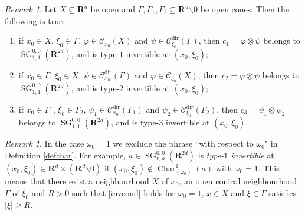 \documentclass[12pt,a4paper,reqno]{amsart}
\numberwithin{equation}{section}
\numberwithin{thm}{section}
\theoremstyle{definition}
\theoremstyle{remark}
\newtheorem{rem}[thm]{Remark}
\begin{document}
\par

\begin{rem}\label{psiinvremark}
Let $X\subseteq {\mathbf R^{d}}$ be open and $\Gamma ,\Gamma _1,\Gamma _2
\subseteq {\mathbf R^{d}}{\backslash {0}}$
be open cones. Then the following is true.
\begin{enumerate}
\item if $x_0\in X$, $\xi _0\in \Gamma$, ${\varphi} \in \mathscr
C _{x _0}(X)$ and $\psi \in \mathscr C ^{{\operatorname{dir}}} _{\xi _0}(\Gamma )$,
then $c_1={\varphi} \otimes \psi$ belongs to ${\operatorname{SG}}^{0,0}_{1,1}({\mathbf R^{{2d}}})$,
and is type-$1$ invertible at $(x_0,\xi _0)$;

{\vspace{0.1cm}}

\item if $x_0\in \Gamma$, $\xi _0\in X$, $\psi \in \mathscr C ^{{\operatorname{dir}}}
_{x_0}(\Gamma )$ and ${\varphi} \in \mathscr C _{\xi  _0}(X)$,
then $c_2={\varphi} \otimes \psi$ belongs to ${\operatorname{SG}}^{0,0}_{1,1}({\mathbf R^{{2d}}})$,
and is type-$2$ invertible at $(x_0,\xi _0)$;

{\vspace{0.1cm}}

\item if $x_0\in \Gamma _1$, $\xi _0\in \Gamma _2$, $\psi _1\in
\mathscr C ^{{\operatorname{dir}}} _{x_0}(\Gamma _1)$ and $\psi _2\in
\mathscr C ^{{\operatorname{dir}}} _{\xi _0}(\Gamma _2)$, then $c_3=\psi _1 \otimes
\psi _2$ belongs to ${\operatorname{SG}}^{0,0}_{1,1}({\mathbf R^{{2d}}})$, and is type-$3$
invertible at $(x_0,\xi _0)$.
\end{enumerate}
\end{rem}

\par

\begin{rem}
In the case $\omega _0=1$ we exclude the phrase ``with respect to
$\omega _0$" in Definition \ref{defchar}. For example, $a\in
{\operatorname{SG}}^{0,0}_{r,\rho}({\mathbf R^{{2d}}})$ is \emph{type-$1$ invertible} at
$(x_0,\xi_0) \in {\mathbf R^{d}}\times ({\mathbf R^{d}}{\backslash {0}})$ if $(x_0,\xi _0)\notin
{\operatorname{Char}} ^1 _{(\omega _0)}(a)$ with $\omega _0=1$. This means that there
exist a neighbourhood $X$ of $x_0$, an open conical
neighbourhood $\Gamma$ of $\xi_0$ and $R>0$ such that
\eqref{invcond} holds for $\omega _0=1$, $x\in X$ and $\xi\in \Gamma$
satisfies $|\xi|\geq R$.
\end{rem}
\end{document}
